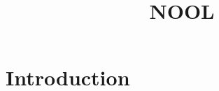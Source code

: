 \documentclass[preprint,10pt,nonatbib]{sigplanconf}
\title{NOOL}
\begin{document}
\maketitle
\eject

\begin{abstract}
 
\end{abstract}

\section{Introduction}


% 

% 

\small

\end{document}
